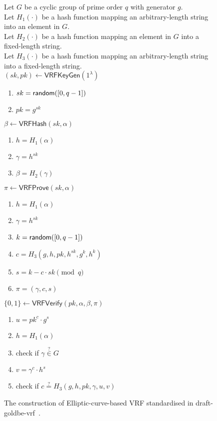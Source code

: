 
\begin{figure}[]
    \begin{mdframed}

        Let $G$ be a cyclic group of prime order $q$ with generator $g$.\\
        Let $H_1(\cdot)$ be a hash function mapping an arbitrary-length string into an element in $G$.\\
        Let $H_2(\cdot)$ be a hash function mapping an element in $G$ into a fixed-length string.\\
        Let $H_3(\cdot)$ be a hash function mapping an arbitrary-length string into a fixed-length string.\\

        $(sk, pk) \gets \mathsf{VRFKeyGen}(1^{\lambda})$
        \begin{enumerate}
            \item $sk = \mathsf{random}(\interval{0}{q-1})$
            \item $pk = g^{sk}$
        \end{enumerate}

        $\beta \gets \mathsf{VRFHash}(sk, \alpha)$
        \begin{enumerate}
            \item $h = H_{1}(\alpha)$
            \item $\gamma = h^{sk}$
            \item $\beta = H_{2}(\gamma)$
        \end{enumerate}

        $\pi \gets \mathsf{VRFProve}(sk, \alpha)$
        \begin{enumerate}
            \item $h = H_{1}(\alpha)$
            \item $\gamma = h^{sk}$
            \item $k = \mathsf{random}(\interval{0}{q-1})$
            \item $c = H_{3}(g, h, pk, h^{sk}, g^{k}, h^{k})$
            \item $s = k - c \cdot sk \pmod{q}$
            \item $\pi = (\gamma, c, s)$
        \end{enumerate}

        $\{0, 1\} \gets \mathsf{VRFVerify}(pk, \alpha, \beta, \pi)$
        \begin{enumerate}
            \item $u = pk^{c} \cdot g^{s}$
            \item $h = H_{1}(\alpha)$
            \item check if $\gamma \stackrel{?}{\in} G$
            \item $v = \gamma^{c} \cdot h^{s}$
            \item check if $c \stackrel{?}{=} H_{3}(g, h, pk, \gamma, u, v)$
        \end{enumerate}

    \end{mdframed}

    \label{fig:standard-ecvrf}
    \caption{The construction of Elliptic-curve-based VRF standardised in draft-goldbe-vrf~\cite{goldberg2017draft}.}
\end{figure}
